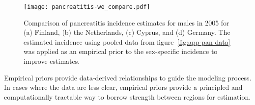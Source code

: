     \begin{figure}[h]
        \begin{center}
            \texttt{[image: pancreatitis-we\_compare.pdf]}
            \caption[Comparison of pancreatitis incidence estimates.]
             {Comparison of pancreatitis incidence estimates
              for males in 2005 for (a) Finland, (b) the Netherlands, (c)
              Cyprus, and (d) Germany.  The estimated incidence using
              pooled data from figure~\ref{fig:app-pan data} was
              applied as an empirical prior to the sex-specific
              incidence to improve estimates.}
            \label{fig:app-pan compare}
        \end{center}
    \end{figure}

Empirical priors provide data-derived relationships to guide the
modeling process.  In cases where the data are less clear, empirical
priors provide a principled and computationally tractable way to
borrow strength between regions for estimation.